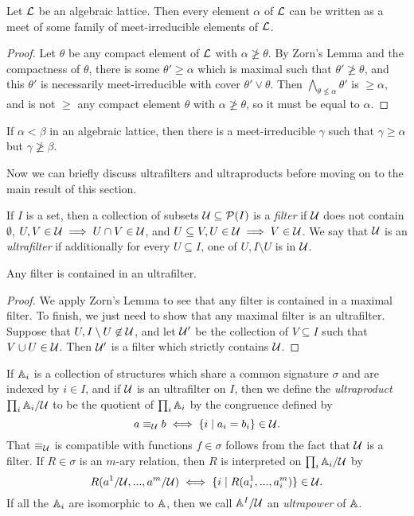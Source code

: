 \begin{appendices}
\begin{prop}\label{meet-irreducible-rep} Let $\mathcal{L}$ be an algebraic lattice. Then every element $\alpha$ of $\mathcal{L}$ can be written as a meet of some family of meet-irreducible elements of $\mathcal{L}$.
\end{prop}
\begin{proof} Let $\theta$ be any compact element of $\mathcal{L}$ with $\alpha \not\ge \theta$. By Zorn's Lemma and the compactness of $\theta$, there is some $\theta' \ge \alpha$ which is maximal such that $\theta' \not\ge \theta$, and this $\theta'$ is necessarily meet-irreducible with cover $\theta' \vee \theta$. Then $\bigwedge_{\theta \not\le \alpha} \theta'$ is $\ge \alpha$, and is not $\ge$ any compact element $\theta$ with $\alpha \not\ge \theta$, so it must be equal to $\alpha$.
\end{proof}

\begin{cor}\label{meet-irreducible} If $\alpha < \beta$ in an algebraic lattice, then there is a meet-irreducible $\gamma$ such that $\gamma \ge \alpha$ but $\gamma \not\ge \beta$.
\end{cor}

Now we can briefly discuss ultrafilters and ultraproducts before moving on to the main result of this section.

\begin{defn} If $I$ is a set, then a collection of subsets $\mathcal{U} \subseteq \mathcal{P}(I)$ is a \emph{filter} if $\mathcal{U}$ does not contain $\emptyset$, $U,V \in \mathcal{U} \implies U\cap V \in \mathcal{U}$, and $U \subseteq V, U \in \mathcal{U} \implies V \in \mathcal{U}$. We say that $\mathcal{U}$ is an \emph{ultrafilter} if additionally for every $U \subseteq I$, one of $U, I\setminus U$ is in $\mathcal{U}$.
\end{defn}

\begin{prop} Any filter is contained in an ultrafilter.
\end{prop}
\begin{proof} We apply Zorn's Lemma to see that any filter is contained in a maximal filter. To finish, we just need to show that any maximal filter is an ultrafilter. Suppose that $U, I\setminus U \not\in \mathcal{U}$, and let $\mathcal{U}'$ be the collection of $V \subseteq I$ such that $V\cup U \in \mathcal{U}$. Then $\mathcal{U}'$ is a filter which strictly contains $\mathcal{U}$.
\end{proof}

\begin{defn} If $\mathbb{A}_i$ is a collection of structures which share a common signature $\sigma$ and are indexed by $i \in I$, and if $\mathcal{U}$ is an ultrafilter on $I$, then we define the \emph{ultraproduct} $\prod_i \mathbb{A}_i/\mathcal{U}$ to be the quotient of $\prod_i \mathbb{A}_i$ by the congruence defined by
\[
a \equiv_{\mathcal{U}} b \iff \{i \mid a_i = b_i\} \in \mathcal{U}.
\]
That $\equiv_{\mathcal{U}}$ is compatible with functions $f \in \sigma$ follows from the fact that $\mathcal{U}$ is a filter. If $R \in \sigma$ is an $m$-ary relation, then $R$ is interpreted on $\prod_i \mathbb{A}_i/\mathcal{U}$ by
\[
R(a^1/\mathcal{U}, ..., a^m/\mathcal{U}) \iff \{i \mid R(a^1_i, ..., a^m_i)\} \in \mathcal{U}.
\]
If all the $\mathbb{A}_i$ are isomorphic to $\mathbb{A}$, then we call $\mathbb{A}^I/\mathcal{U}$ an \emph{ultrapower} of $\mathbb{A}$.
\end{defn}


\end{appendices}
